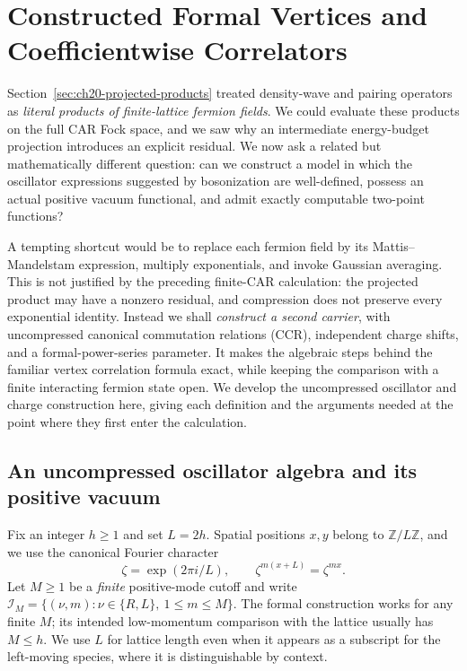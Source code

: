 \section{Constructed Formal Vertices and Coefficientwise Correlators}
\label{sec:ch20-formal-vertices}

Section~\ref{sec:ch20-projected-products} treated density-wave and pairing
operators as \emph{literal products of finite-lattice fermion fields}.  We
could evaluate these products on the full CAR Fock space, and we saw why an
intermediate energy-budget projection introduces an explicit residual.  We
now ask a related but mathematically different question: can we construct a
model in which the oscillator expressions suggested by bosonization are
well-defined, possess an actual positive vacuum functional, and admit
exactly computable two-point functions?

A tempting shortcut would be to replace each fermion field by its
Mattis--Mandelstam expression, multiply exponentials, and invoke Gaussian
averaging.  This is not justified by the preceding finite-CAR calculation:
the projected product may have a nonzero residual, and compression does not
preserve every exponential identity.  Instead we shall \emph{construct a
second carrier}, with uncompressed canonical commutation relations (CCR),
independent charge shifts, and a formal-power-series parameter.  It makes
the algebraic steps behind the familiar vertex correlation formula exact,
while keeping the comparison with a finite interacting fermion state open.
We develop the uncompressed oscillator and charge construction here, giving
each definition and the arguments needed at the point where they first enter
the calculation.

\subsection{An uncompressed oscillator algebra and its positive vacuum}
\label{subsec:ch20b-oscillator}

Fix an integer \(h\geq 1\) and set \(L=2h\).  Spatial positions
\(x,y\) belong to \(\mathbb Z/L\mathbb Z\), and we use the canonical
Fourier character
\begin{equation}
 \zeta=\exp(2\pi i/L), \qquad
 \zeta^{m(x+L)}=\zeta^{mx}.
 \label{eq:ch20b-character}
\end{equation}
Let \(M\geq1\) be a \emph{finite} positive-mode cutoff and write
\(\mathcal I_M=\{(\nu,m):\nu\in\{R,L\},\ 1\leq m\leq M\}\).
The formal construction works for any finite \(M\); its intended
low-momentum comparison with the lattice usually has \(M\leq h\).
We use \(L\) for lattice length even when it appears as a subscript
for the left-moving species, where it is distinguishable by context.

